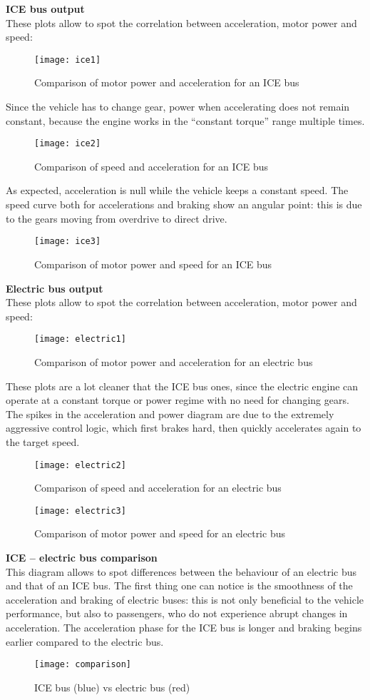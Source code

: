 \documentclass{article}
\begin{document}
\textbf{ICE bus output}\\
These plots allow to spot the correlation between acceleration, motor power and speed: 
\begin{figure}[H]
\centering
\texttt{[image: ice1]}
\caption{Comparison of motor power and acceleration for an ICE bus}
\end{figure} 
Since the vehicle has to change gear, power when accelerating does not remain constant, because the engine works in the “constant torque” range multiple times. 
\begin{figure}[H]
\centering
\texttt{[image: ice2]}
\caption{Comparison of speed and acceleration for an ICE bus}
\end{figure} 
As expected, acceleration is null while the vehicle keeps a constant speed. The speed curve both for accelerations and braking show an angular point: this is due to the gears moving from overdrive to direct drive. 
\begin{figure}[H]
\centering
\texttt{[image: ice3]}
\caption{Comparison of motor power and speed for an ICE bus}
\end{figure} 
\textbf{Electric bus output}\\
These plots allow to spot the correlation between acceleration, motor power and speed: 
\begin{figure}[H]
\centering
\texttt{[image: electric1]}
\caption{Comparison of motor power and acceleration for an electric bus}
\end{figure} 
These plots are a lot cleaner that the ICE bus ones, since the electric engine can operate at a constant torque or power regime with no need for changing gears. The spikes in the acceleration and power diagram are due to the extremely aggressive control logic, which first brakes hard, then quickly accelerates again to the target speed. 
\begin{figure}[H]
\centering
\texttt{[image: electric2]}
\caption{Comparison of speed and acceleration for an electric bus}
\end{figure} 
\begin{figure}[H]
\centering
\texttt{[image: electric3]}
\caption{Comparison of motor power and speed for an electric bus}
\end{figure}
\textbf{ICE – electric bus comparison}\\
This diagram allows to spot differences between the behaviour of an electric bus and that of an ICE bus. The first thing one can notice is the smoothness of the acceleration and braking of electric buses: this is not only beneficial to the vehicle performance, but also to passengers, who do not experience abrupt changes in acceleration. The acceleration phase for the ICE bus is longer and braking begins earlier compared to the electric bus. 
\begin{figure}[H]
\centering
\texttt{[image: comparison]}
\caption{ICE bus (blue) vs electric bus (red)}
\end{figure}
\newpage
\end{document}
